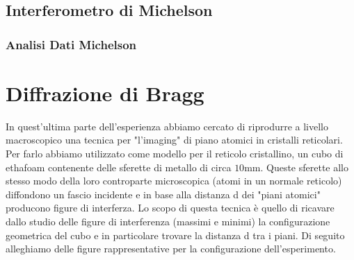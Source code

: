 \documentclass[letterpaper,12pt]{article}
\begin{document}
\subsection{Interferometro di Michelson}


\subsubsection{Analisi Dati Michelson}

\newpage
\section{Diffrazione di Bragg}
In quest'ultima parte dell'esperienza abbiamo cercato di riprodurre a livello macroscopico 
una tecnica per "l'imaging" di piano atomici in cristalli reticolari. Per farlo abbiamo utilizzato come modello per il reticolo cristallino, un cubo di ethafoam 
contenente delle sferette di metallo di circa $10$mm. Queste sferette allo stesso modo della loro controparte microscopica (atomi in un normale reticolo) diffondono un fascio incidente e in base alla distanza d dei "piani atomici" producono figure di interferza.
Lo scopo di questa tecnica è quello di ricavare dallo studio delle figure di interferenza (massimi e minimi) la configurazione geometrica del cubo e in particolare trovare la distanza d tra i piani.
Di seguito alleghiamo delle figure rappresentative per la configurazione dell'esperimento.
\end{document}
